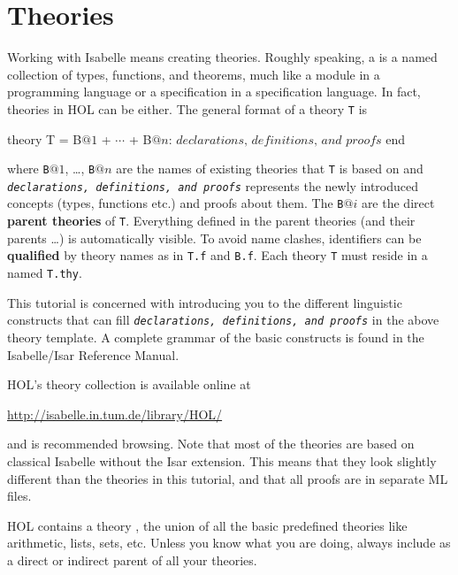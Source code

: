 \section{Theories}
\label{sec:Basic:Theories}

Working with Isabelle means creating theories. Roughly speaking, a
 is a named collection of types, functions, and theorems,
much like a module in a programming language or a specification in a
specification language. In fact, theories in HOL can be either. The general
format of a theory \texttt{T} is
\begin{ttbox}
theory T = B\(@1\) + \(\cdots\) + B\(@n\):
\(\textit{declarations, definitions, and proofs}\)
end
\end{ttbox}
where \texttt{B}$@1$, \dots, \texttt{B}$@n$ are the names of existing
theories that \texttt{T} is based on and \texttt{\textit{declarations,
    definitions, and proofs}} represents the newly introduced concepts
(types, functions etc.) and proofs about them. The \texttt{B}$@i$ are the
direct \textbf{parent theories} of \texttt{T}.
Everything defined in the parent theories (and their parents \dots) is
automatically visible. To avoid name clashes, identifiers can be
\textbf{qualified} by theory names as in \texttt{T.f} and
\texttt{B.f}. Each theory \texttt{T} must
reside in a  named \texttt{T.thy}.

This tutorial is concerned with introducing you to the different linguistic
constructs that can fill \textit{\texttt{declarations, definitions, and
    proofs}} in the above theory template.  A complete grammar of the basic
constructs is found in the Isabelle/Isar Reference Manual.

HOL's theory collection is available online at
\begin{center}\small
    \url{http://isabelle.in.tum.de/library/HOL/}
\end{center}
and is recommended browsing. Note that most of the theories 
are based on classical Isabelle without the Isar extension. This means that
they look slightly different than the theories in this tutorial, and that all
proofs are in separate ML files.

\begin{warn}
  HOL contains a theory , the union of all the basic
  predefined theories like arithmetic, lists, sets, etc.  
  Unless you know what you are doing, always include 
  as a direct or indirect parent of all your theories.
\end{warn}


